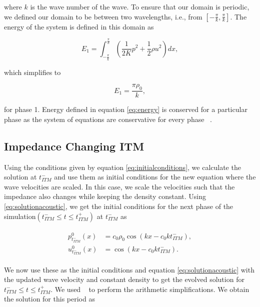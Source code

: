 where $k$ is the wave number of the wave. To ensure that our domain is periodic, we defined our domain to be between two wavelengths, i.e., from 
$\left[-\frac{\pi}{k}, \frac{\pi}{k}\right]$. The energy of the system is defined in this domain as ~\parencite{Kopriva2021}

\begin{equation}
     E_1 = \int_{-\frac{\pi}{k}}^{\frac{\pi}{k}} \left(\frac{1}{2K}p^2 + \frac{1}{2}\rho u^2\right) dx,
    \label{eq:energy}
\end{equation}

which simplifies to 

\begin{equation}
    E_1 = \frac{\pi\rho_0}{k},
\end{equation}

for phase 1. Energy defined in equation \ref{eq:energy} is conserved for a particular phase as the system of equations are conservative for every phase ~\parencite{Kopriva2021}. 

\subsection{\texorpdfstring{Impedance Changing \ac{ITM}}{Impedance Changing ITM}}\label{section:impedancechangingITM}
Using the conditions given by equation \ref{eq:initialconditions}, we calculate the solution at $t_{ITM}^-$ and use them as initial conditions for the new equation where the wave velocities are scaled.
In this case, we scale the velocities such that the impedance also changes while keeping the density constant. Using \ref{eq:solutionacoustic}, we get the initial conditions for the next phase of the simulation$\left(t_{ITM}^- \leq t \leq t_{ITM}^+ \right)$ at $t_{ITM}^-$ as

\begin{align}
    \begin{split}
        p^0_{t_{ITM}^-}\left(x\right) &= c_0 \rho_0 \cos\left(kx - c_0kt_{ITM}^-\right), \\
        u^0_{t_{ITM}^-}\left(x\right) &= \cos\left(kx - c_0kt_{ITM}^-\right) .
    \end{split}
\end{align}

We now use these as the initial conditions and equation \ref{eq:solutionacoustic} with the updated wave velocity and constant density to get the evolved solution for $t_{ITM}^- \leq t \leq t_{ITM}^+ $. We used ~\parencite{sagemath} to perform the arithmetic simplifications. We obtain the solution for this period as


